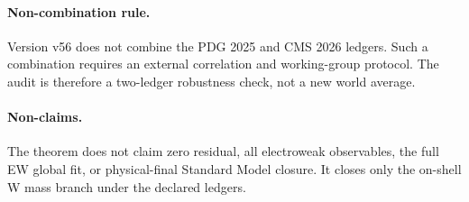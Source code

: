 \paragraph{Non-combination rule.}
Version v56 does not combine the PDG 2025 and CMS 2026 ledgers.  Such a
combination requires an external correlation and working-group protocol.  The
audit is therefore a two-ledger robustness check, not a new world average.

\paragraph{Non-claims.}
The theorem does not claim zero residual, all electroweak observables, the full
EW global fit, or physical-final Standard Model closure.  It closes only the
on-shell W mass branch under the declared ledgers.
